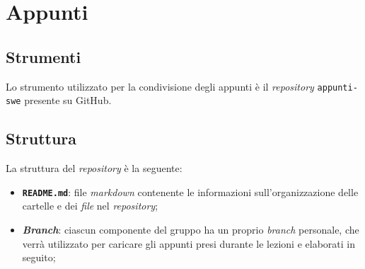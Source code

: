 \section{Appunti}

\subsection{Strumenti}

Lo strumento utilizzato per la condivisione degli appunti è il
\textit{repository} \texttt{appunti-swe} presente su GitHub.

\subsection{Struttura}

La struttura del \textit{repository} è la seguente:
\begin{itemize}
	\item \textbf{\texttt{README.md}}: file \textit{markdown} contenente le
	      informazioni sull'organizzazione delle cartelle e dei \textit{file}
	      nel \textit{repository};

	\item \textbf{\textit{Branch}}: ciascun componente del gruppo ha un proprio
	      \textit{branch} personale, che verrà utilizzato per caricare gli
	      appunti presi durante le lezioni e elaborati in seguito;
\end{itemize}
